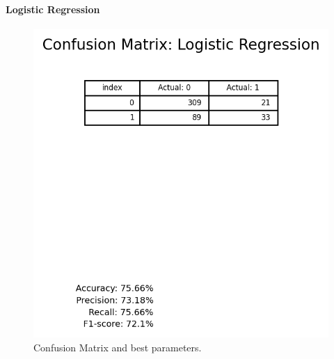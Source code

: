             \paragraph{Logistic Regression}
                \begin{figure}[H]
                        \centering
                        \includegraphics[scale=1]{images/dm_confu_mat_logi_regr}
                        \caption{Confusion Matrix and best parameters.}
                        \label{fig:dm-logistic-regression}
                \end{figure}
